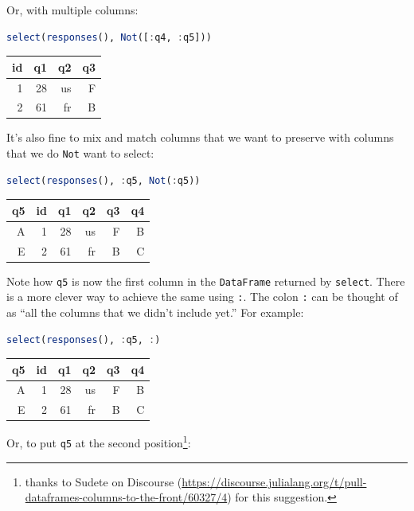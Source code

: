 \documentclass[
  notoc %
]{tufte-book}
\newcommand{\passthrough}[1]{#1}
\begin{document}
Or, with multiple columns:

\begin{lstlisting}[language=Julia]
select(responses(), Not([:q4, :q5]))
\end{lstlisting}

\begin{longtable}[]{@{}rrrr@{}}
\toprule
id & q1 & q2 & q3 \\
\midrule
\endhead
1 & 28 & us & F \\
2 & 61 & fr & B \\
\bottomrule
\end{longtable}

It's also fine to mix and match columns that we want to preserve with
columns that we do \passthrough{\lstinline!Not!} want to select:

\begin{lstlisting}[language=Julia]
select(responses(), :q5, Not(:q5))
\end{lstlisting}

\begin{longtable}[]{@{}rrrrrr@{}}
\toprule
q5 & id & q1 & q2 & q3 & q4 \\
\midrule
\endhead
A & 1 & 28 & us & F & B \\
E & 2 & 61 & fr & B & C \\
\bottomrule
\end{longtable}

Note how \passthrough{\lstinline!q5!} is now the first column in the
\passthrough{\lstinline!DataFrame!} returned by
\passthrough{\lstinline!select!}. There is a more clever way to achieve
the same using \passthrough{\lstinline!:!}. The colon
\passthrough{\lstinline!:!} can be thought of as ``all the columns that
we didn't include yet.'' For example:

\begin{lstlisting}[language=Julia]
select(responses(), :q5, :)
\end{lstlisting}

\begin{longtable}[]{@{}rrrrrr@{}}
\toprule
q5 & id & q1 & q2 & q3 & q4 \\
\midrule
\endhead
A & 1 & 28 & us & F & B \\
E & 2 & 61 & fr & B & C \\
\bottomrule
\end{longtable}

Or, to put \passthrough{\lstinline!q5!} at the second
position\footnote{thanks to Sudete on Discourse
  (\url{https://discourse.julialang.org/t/pull-dataframes-columns-to-the-front/60327/4})
  for this suggestion.}:
\end{document}
